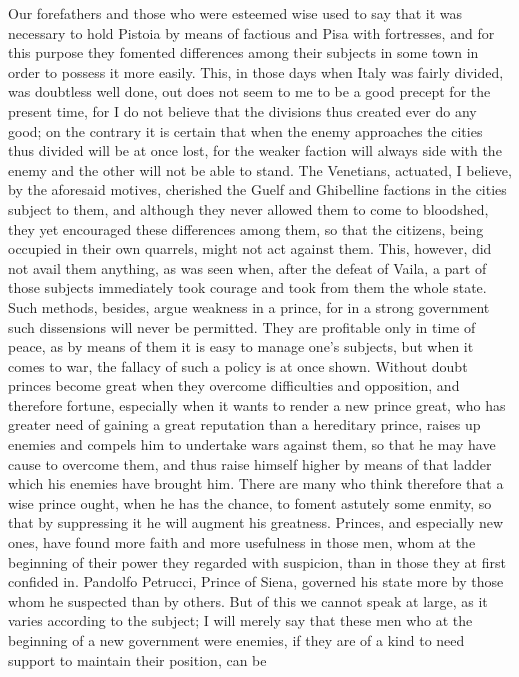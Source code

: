 \documentclass[12pt,letterpaper]{memoir}
\begin{document}
Our forefathers and those who were esteemed wise used to say that
it was necessary to hold Pistoia by means of factious and Pisa with
fortresses, and for this purpose they fomented differences among their
subjects in some town in order to possess it more easily. This, in
those days when Italy was fairly divided, was doubtless well done, out
does not seem to me to be a good precept for the present time, for I do
not believe that the divisions thus created ever do any good; on the
contrary it is certain that when the enemy approaches the cities thus
divided will be at once lost, for the weaker faction will always side
with the enemy and the other will not be able to stand. The Venetians,
actuated, I believe, by the aforesaid motives, cherished the Guelf
and Ghibelline factions in the cities subject to them, and although
they never allowed them to come to bloodshed, they yet encouraged
these differences among them, so that the citizens, being occupied in
their own quarrels, might not act against them. This, however, did
not avail them anything, as was seen when, after the defeat of Vaila,
a part of those subjects immediately took courage and took from them
the whole state. Such methods, besides, argue weakness in a prince,
for in a strong government such dissensions will never be permitted.
They are profitable only in time of peace, as by means of them it is
easy to manage one's subjects, but when it comes to war, the fallacy
of such a policy is at once shown. Without doubt princes become great
when they overcome difficulties and opposition, and therefore fortune,
especially when it wants to render a new prince great, who has greater
need of gaining a great reputation than a hereditary prince, raises up
enemies and compels him to undertake wars against them, so that he may
have cause to overcome them, and thus raise himself higher by means
of that ladder which his enemies have brought him. There are many who
think therefore that a wise prince ought, when he has the chance, to
foment astutely some enmity, so that by suppressing it he will augment
his greatness. Princes, and especially new ones, have found more faith
and more usefulness in those men, whom at the beginning of their power
they regarded with suspicion, than in those they at first confided
in. Pandolfo Petrucci, Prince of Siena, governed his state more by
those whom he suspected than by others. But of this we cannot speak at
large, as it varies according to the subject; I will merely say that
these men who at the beginning of a new government were enemies, if
they are of a kind to need support to maintain their position, can be
\end{document}

